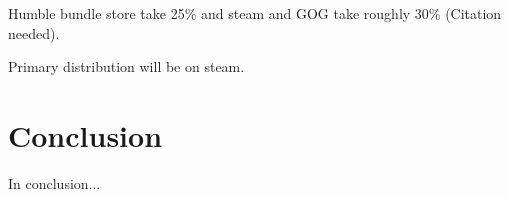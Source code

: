 \documentclass{scrartcl}
\begin{document}
Humble bundle store take 25\% \cite{HumblebundleFAQ} and steam and GOG take roughly 30\% (Citation needed).

Primary distribution will be on steam.

\section{Conclusion}
In conclusion...






\end{document}
